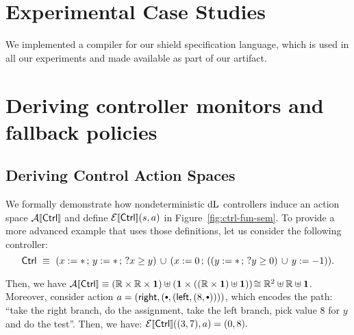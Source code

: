 \documentclass[acmsmall,screen,nonacm]{acmart}
\begin{document}




\appendix

\section{Experimental Case Studies}\label{ap:experiments}

We implemented a compiler for our shield specification language, which is used in all our experiments and made available as part of our artifact.






\section{Deriving controller monitors and fallback policies}\label{ap:ctrl-monitor}

\subsection{Deriving Control Action Spaces}
\label{ap:defining-action-ctrl}
We formally demonstrate how nondeterministic $\mathop{}\!\mathrm{d} \text{L}$ controllers induce an action space $\CtrlActionSem{\Ctrl}$ and define $\CtrlExeSem{\Ctrl}(s, a)$ in Figure~\ref{fig:ctrl-fun-sem}. To provide a more advanced example that uses those definitions, let us consider the following controller:
\[
\mathsf{Ctrl} \ \equiv \ (x := * \,;\, y := * \,;\, ?x \ge y) \,\cup\, (x := 0 \,;\, ((y := * \,;\, ?y \ge 0) \,\cup\, y := -1)).
\]

Then, we have $\CtrlActionSem{\Ctrl} \equiv (\Reals \times \Reals \times \UnitSet) \uplus (\UnitSet \times ((\Reals \times \UnitSet) \uplus \UnitSet)) \!\IsomorphTo \Reals^2 \uplus \Reals \uplus \UnitSet$. Moreover, consider action $a = \SumRightInj{(\Unit, \SumLeftInj{(8, \Unit)})}$, which encodes the path: ``take the right branch, do the assignment, take the left branch, pick value $8$ for $y$ and do the test''. Then, we have: \(\CtrlExeSem{\Ctrl}((3, 7), a) = (0, 8). \)
\end{document}
